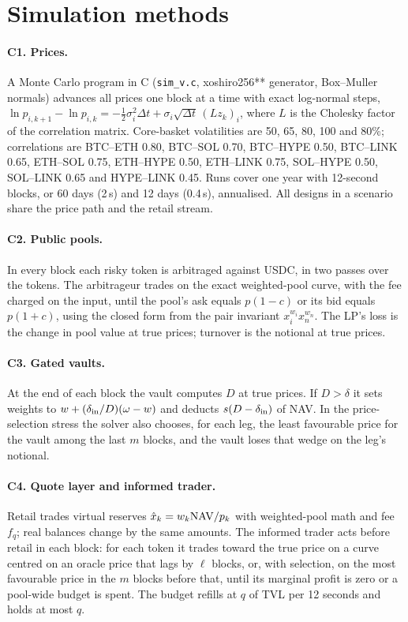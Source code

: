 \section{Simulation methods}
\label{app:sim}

\paragraph{C1. Prices.} A Monte Carlo program in C (\texttt{sim\_v.c}, xoshiro256** generator, Box--Muller normals) advances all prices one block at a time with exact log-normal steps, $\ln p_{i,k+1}-\ln p_{i,k}=-\tfrac12\sigma_i^2\Delta t+\sigma_i\sqrt{\Delta t}\,(Lz_k)_i$, where $L$ is the Cholesky factor of the correlation matrix. Core-basket volatilities are 50, 65, 80, 100 and 80\%; correlations are BTC--ETH 0.80, BTC--SOL 0.70, BTC--HYPE 0.50, BTC--LINK 0.65, ETH--SOL 0.75, ETH--HYPE 0.50, ETH--LINK 0.75, SOL--HYPE 0.50, SOL--LINK 0.65 and HYPE--LINK 0.45. Runs cover one year with 12-second blocks, or 60 days (2\,s) and 12 days (0.4\,s), annualised. All designs in a scenario share the price path and the retail stream.

\paragraph{C2. Public pools.} In every block each risky token is arbitraged against USDC, in two passes over the tokens. The arbitrageur trades on the exact weighted-pool curve, with the fee charged on the input, until the pool's ask equals $p(1-c)$ or its bid equals $p(1+c)$, using the closed form from the pair invariant $x_i^{w_i}x_n^{w_n}$. The LP's loss is the change in pool value at true prices; turnover is the notional at true prices.

\paragraph{C3. Gated vaults.} At the end of each block the vault computes $D$ at true prices. If $D>\delta$ it sets weights to $w+(\delta_{\mathrm{in}}/D)(\omega-w)$ and deducts $s(D-\delta_{\mathrm{in}})$ of NAV. In the price-selection stress the solver also chooses, for each leg, the least favourable price for the vault among the last $m$ blocks, and the vault loses that wedge on the leg's notional.

\paragraph{C4. Quote layer and informed trader.} Retail trades virtual reserves $\hat x_k=w_k\mathrm{NAV}/p_k$ with weighted-pool math and fee $f_q$; real balances change by the same amounts. The informed trader acts before retail in each block: for each token it trades toward the true price on a curve centred on an oracle price that lags by $\ell$ blocks, or, with selection, on the most favourable price in the $m$ blocks before that, until its marginal profit is zero or a pool-wide budget is spent. The budget refills at $q$ of TVL per 12 seconds and holds at most $q$.

